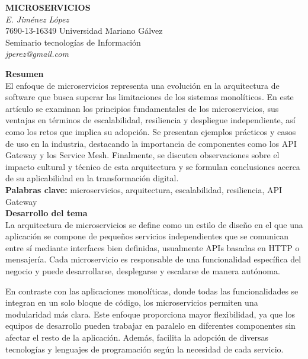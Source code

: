\documentclass[12pt,letterpaper]{article}
\begin{document}

\begin{center}
\textbf{MICROSERVICIOS} \\
\textit{E. Jiménez López} \\
7690-13-16349 Universidad Mariano Gálvez \\
Seminario tecnologías de Información \\
\textit{jperez@gmail.com} \\
\end{center}

\textbf{Resumen} \\
El enfoque de microservicios representa una evolución en la arquitectura de software que busca superar las limitaciones de los sistemas monolíticos. En este artículo se examinan los principios fundamentales de los microservicios, sus ventajas en términos de escalabilidad, resiliencia y despliegue independiente, así como los retos que implica su adopción. Se presentan ejemplos prácticos y casos de uso en la industria, destacando la importancia de componentes como los API Gateway y los Service Mesh. Finalmente, se discuten observaciones sobre el impacto cultural y técnico de esta arquitectura y se formulan conclusiones acerca de su aplicabilidad en la transformación digital. \\

\textbf{Palabras clave:} microservicios, arquitectura, escalabilidad, resiliencia, API Gateway \\

\textbf{Desarrollo del tema} \\
La arquitectura de microservicios se define como un estilo de diseño en el que una aplicación se compone de pequeños servicios independientes que se comunican entre sí mediante interfaces bien definidas, usualmente APIs basadas en HTTP o mensajería. Cada microservicio es responsable de una funcionalidad específica del negocio y puede desarrollarse, desplegarse y escalarse de manera autónoma. 

En contraste con las aplicaciones monolíticas, donde todas las funcionalidades se integran en un solo bloque de código, los microservicios permiten una modularidad más clara. Este enfoque proporciona mayor flexibilidad, ya que los equipos de desarrollo pueden trabajar en paralelo en diferentes componentes sin afectar el resto de la aplicación. Además, facilita la adopción de diversas tecnologías y lenguajes de programación según la necesidad de cada servicio. 
\end{document}
